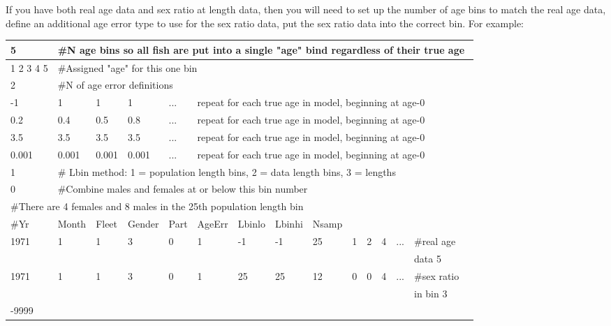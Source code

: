 If you have both real age data and sex ratio at length data, then you will need to set up the number of age bins to match the real age data, define an additional age error type to use for the sex ratio data, put the sex ratio data into the correct bin.  For example:

\begin{center}
	\begin{tabular}{p{1cm} p{1cm} p{1cm} p{1cm} p{1cm} p{1cm} p{1cm} p{1cm} p{1cm} p{0.2cm} p{0.2cm} p{.2cm} p{.2cm} p{.2cm} p{.2cm} p{.2cm} p{0.2cm} }
		\hline
		5 & \multicolumn{16}{l}{\#N age bins so all fish are put into a single "age" bind regardless of their true age}\\
		\hline
		1 2 3 4 5 & \multicolumn{16}{l}{\#Assigned "age" for this one bin}\\
		\hline
		2  & \multicolumn{16}{l}{\#N of age error definitions}\\
		\hline
		-1 & 1 & 1 & 1 & ... & \multicolumn{12}{l}{repeat for each true age in model, beginning at age-0}\\
		0.2 & 0.4 & 0.5 & 0.8 & ... & \multicolumn{12}{l}{repeat for each true age in model, beginning at age-0}\\
	    3.5 & 3.5 & 3.5 & 3.5 & ... & \multicolumn{12}{l}{repeat for each true age in model, beginning at age-0}\\
	    0.001 & 0.001 & 0.001 & 0.001 & ... & \multicolumn{12}{l}{repeat for each true age in model, beginning at age-0}\\
		\hline
		1 & \multicolumn{16}{l}{\# Lbin method: 1 = population length bins, 2 = data length bins, 3 = lengths}\\
		\hline
		0 & \multicolumn{16}{l}{\#Combine males and females at or below this bin number}\\
		\hline
		\multicolumn{17}{l}{\#There are 4 females and 8 males in the 25th population length bin}\\
		\hline
		\#Yr & Month & Fleet & Gender & Part & AgeErr & Lbinlo & Lbinhi & Nsamp & & & & & & & \\
		\hline
		1971 & 1 & 1 & 3 & 0 & 1 & -1 & -1 & 25 & 1 & 2 & 4 & ... &\multicolumn{3}{l}{\#real age}\\
		     &   &   &   &   &   &    &    &    &   &   &   &     &\multicolumn{3}{l}{data 5}\\
		1971 & 1 & 1 & 3 & 0 & 1 & 25 & 25 & 12 & 0 & 0 & 4 & ... &\multicolumn{3}{l}{\#sex ratio}\\
		     &   &   &   &   &   &    &    &    &   &   &   &     &\multicolumn{3}{l}{in bin 3}\\
		-9999  & \multicolumn{16}{l}{}\\
		\hline
	\end{tabular}
\end{center}


